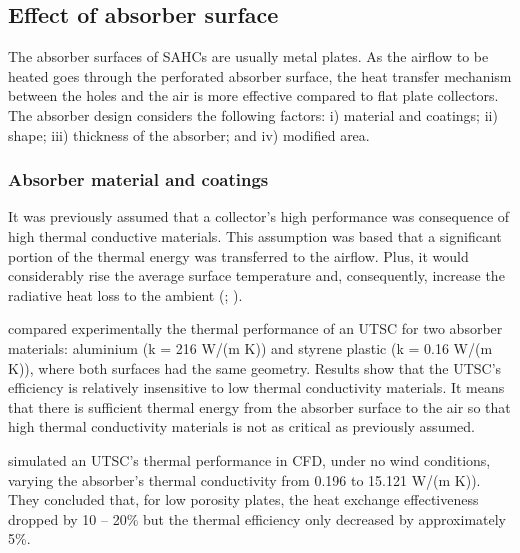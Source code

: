 
\subsection{Effect of absorber surface}  

The absorber surfaces of SAHCs are usually metal plates. As the airflow to be heated goes through the perforated absorber surface, the heat transfer mechanism between the holes and the air is more effective compared to flat plate collectors. The absorber design considers the following factors: i) material and coatings; ii) shape; iii) thickness of the absorber; and iv) modified area.

\subsubsection{Absorber material and coatings} 

It was previously assumed that a collector's high performance was consequence of high thermal conductive materials. This assumption was based that a significant portion of the thermal energy was transferred to the airflow. Plus, it would considerably rise the average surface temperature and, consequently, increase the radiative heat loss to the ambient (\cite{Gawlik2002}; \cite{Gawlik2005}).

\citet{Christensen1997} compared experimentally the thermal performance of an UTSC for two absorber materials: aluminium (k = 216 W/(m K)) and styrene plastic (k = 0.16 W/(m K)), where both surfaces had the same geometry. Results show that the UTSC's efficiency is relatively insensitive to low thermal conductivity materials. It means that there is sufficient thermal energy from the absorber surface to the air so that high thermal conductivity materials is not as critical as previously assumed.

\citet{Arulanandam1999} simulated an UTSC's thermal performance in CFD, under no wind conditions, varying the absorber's thermal conductivity from 0.196 to 15.121 W/(m K)). They concluded that, for low porosity plates, the heat exchange effectiveness dropped by 10 -- 20\% but the thermal efficiency only decreased by approximately 5\%.

